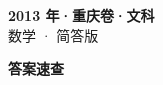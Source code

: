 \documentclass[zihao=-4, a4paper]{ctexart}
\begin{document}
\begin{center}
  {\Large\bfseries 2013 年·重庆卷·文科}\\[4pt]
  {\large 数学 · 简答版}
\end{center}
\medskip
{}

\clearpage
{}
\begin{center}{\Large\bfseries 答案速查}\end{center}
\medskip

\end{document}
